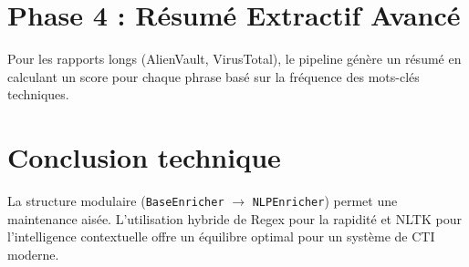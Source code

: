 \documentclass[12pt,a4paper]{article}
\begin{document}
\section{Phase 4 : Résumé Extractif Avancé}
Pour les rapports longs (AlienVault, VirusTotal), le pipeline génère un résumé en calculant un score pour chaque phrase basé sur la fréquence des mots-clés techniques.

\section{Conclusion technique}
La structure modulaire (\texttt{BaseEnricher} $\rightarrow$ \texttt{NLPEnricher}) permet une maintenance aisée. L'utilisation hybride de Regex pour la rapidité et NLTK pour l'intelligence contextuelle offre un équilibre optimal pour un système de CTI moderne.
\end{document}
